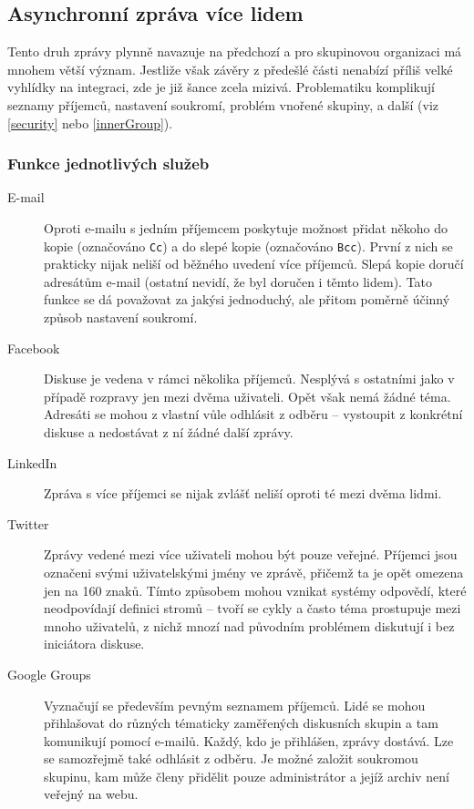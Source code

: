 \documentclass[12pt,oneside,final]{fithesis2}
\begin{document}
\subsection{Asynchronní zpráva více lidem}
Tento druh zprávy plynně navazuje na předchozí a pro skupinovou organizaci má mnohem větší význam. Jestliže však závěry z předešlé části nenabízí příliš velké vyhlídky na integraci, zde je již šance zcela mizivá. Problematiku komplikují seznamy příjemců, nastavení soukromí, problém vnořené skupiny, a další (viz \ref{security} nebo \ref{innerGroup}).

\subsubsection*{Funkce jednotlivých služeb}
\begin{description}
    \item[E-mail]
        Oproti e-mailu s jedním příjemcem poskytuje možnost přidat někoho do kopie (označováno {\tt Cc}) a do slepé kopie (označováno {\tt Bcc}). První z nich se prakticky nijak neliší od běžného uvedení více příjemců. Slepá kopie doručí adresátům e-mail  (ostatní nevidí, že byl doručen i těmto lidem). Tato funkce se dá považovat za jakýsi jednoduchý, ale přitom poměrně účinný způsob nastavení soukromí.

    \item[Facebook]
        Diskuse je vedena v rámci několika příjemců. Nesplývá s ostatními jako v případě rozpravy jen mezi dvěma uživateli. Opět však nemá žádné téma. Adresáti se mohou z vlastní vůle odhlásit z odběru -- vystoupit z konkrétní diskuse a nedostávat z ní žádné další zprávy.

    \item[LinkedIn]
        Zpráva s více příjemci se nijak zvlášť neliší oproti té mezi dvěma lidmi.

    \item[Twitter]
        Zprávy vedené mezi více uživateli mohou být pouze veřejné. Příjemci jsou označeni svými uživatelskými jmény ve zprávě, přičemž ta je opět omezena jen na 160 znaků. Tímto způsobem mohou vznikat systémy odpovědí, které neodpovídají definici stromů -- tvoří se cykly a často téma prostupuje mezi mnoho uživatelů, z nichž mnozí nad původním problémem diskutují i bez iniciátora diskuse.

    \item[Google Groups]
        Vyznačují se především pevným seznamem příjemců. Lidé se mohou přihlašovat do různých tématicky zaměřených diskusních skupin a tam komunikují pomocí e-mailů. Každý, kdo je přihlášen, zprávy dostává. Lze se samozřejmě také odhlásit z odběru. Je možné založit soukromou skupinu, kam může členy přidělit pouze administrátor a jejíž archiv není veřejný na webu.


\end{description}
\end{document}

